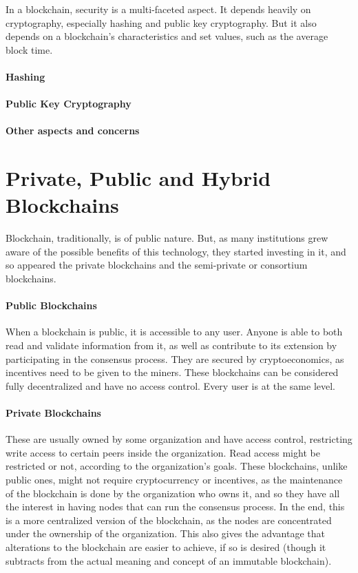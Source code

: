 In a blockchain, security is a multi-faceted aspect. It depends heavily on cryptography, especially hashing and public key cryptography. But it also depends on a blockchain's characteristics and set values, such as the average block time.

\paragraph{Hashing}

\paragraph{Public Key Cryptography}

\paragraph{Other aspects and concerns}

\section{Private, Public and Hybrid Blockchains}

    Blockchain, traditionally, is of public nature. But, as many institutions grew aware of the possible benefits of this technology, they started investing in it, and so appeared the private blockchains and the semi-private or consortium blockchains.
    
    \paragraph{Public Blockchains} When a blockchain is public, it is accessible to any user. Anyone is able to both read and validate information from it, as well as contribute to its extension by participating in the consensus process. They are secured by cryptoeconomics, as incentives need to be given to the miners. These blockchains can be  considered fully decentralized and have no access control. Every user is at the same level.
    
    \paragraph{Private Blockchains} These are usually owned by some organization and have access control, restricting write access to certain peers inside the organization. Read access might be restricted or not, according to the organization's goals. These blockchains, unlike public ones, might not require cryptocurrency or incentives, as the maintenance of the blockchain is done by the organization who owns it, and so they have all the interest in having nodes that can run the consensus process. In the end, this is a more centralized version of the blockchain, as the nodes are concentrated under the ownership of the organization. This also gives the advantage that alterations to the blockchain are easier to achieve, if so is desired (though it subtracts from the actual meaning and concept of an immutable blockchain).
    
